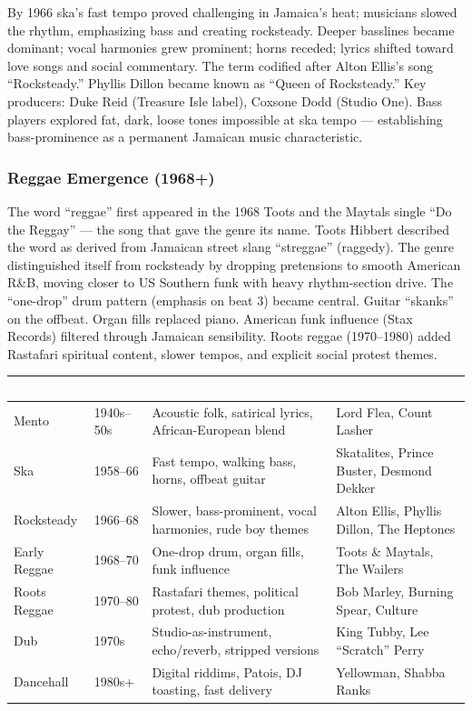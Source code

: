 \documentclass[11pt,letterpaper]{article}
\newcommand{\tableheader}[1]{\textbf{\sffamily\textcolor{white}{#1}}}
\begin{document}
By 1966 ska's fast tempo proved challenging in Jamaica's heat; musicians slowed the rhythm, emphasizing bass and creating rocksteady. Deeper basslines became dominant; vocal harmonies grew prominent; horns receded; lyrics shifted toward love songs and social commentary. The term codified after Alton Ellis's song ``Rocksteady.'' Phyllis Dillon became known as ``Queen of Rocksteady.'' Key producers: Duke Reid (Treasure Isle label), Coxsone Dodd (Studio One). Bass players explored fat, dark, loose tones impossible at ska tempo --- establishing bass-prominence as a permanent Jamaican music characteristic.

\subsubsection{Reggae Emergence (1968+)}

The word ``reggae'' first appeared in the 1968 Toots and the Maytals single ``Do the Reggay'' --- the song that gave the genre its name. Toots Hibbert described the word as derived from Jamaican street slang ``streggae'' (raggedy). The genre distinguished itself from rocksteady by dropping pretensions to smooth American R\&B, moving closer to US Southern funk with heavy rhythm-section drive. The ``one-drop'' drum pattern (emphasis on beat 3) became central. Guitar ``skanks'' on the offbeat. Organ fills replaced piano. American funk influence (Stax Records) filtered through Jamaican sensibility. Roots reggae (1970--1980) added Rastafari spiritual content, slower tempos, and explicit social protest themes.

\begin{center}
\begin{tabularx}{\textwidth}{L{2.5cm}L{2cm}L{4.5cm}L{4cm}}
\toprule
{}
\tableheader{Genre} & \tableheader{Years} & \tableheader{Key Characteristics} & \tableheader{Key Artists} \\
\midrule
Mento & 1940s--50s & Acoustic folk, satirical lyrics, African-European blend & Lord Flea, Count Lasher \\
Ska & 1958--66 & Fast tempo, walking bass, horns, offbeat guitar & Skatalites, Prince Buster, Desmond Dekker \\
Rocksteady & 1966--68 & Slower, bass-prominent, vocal harmonies, rude boy themes & Alton Ellis, Phyllis Dillon, The Heptones \\
Early Reggae & 1968--70 & One-drop drum, organ fills, funk influence & Toots \& Maytals, The Wailers \\
Roots Reggae & 1970--80 & Rastafari themes, political protest, dub production & Bob Marley, Burning Spear, Culture \\
Dub & 1970s & Studio-as-instrument, echo/reverb, stripped versions & King Tubby, Lee ``Scratch'' Perry \\
Dancehall & 1980s+ & Digital riddims, Patois, DJ toasting, fast delivery & Yellowman, Shabba Ranks \\
\bottomrule
\end{tabularx}
\end{center}
\end{document}
